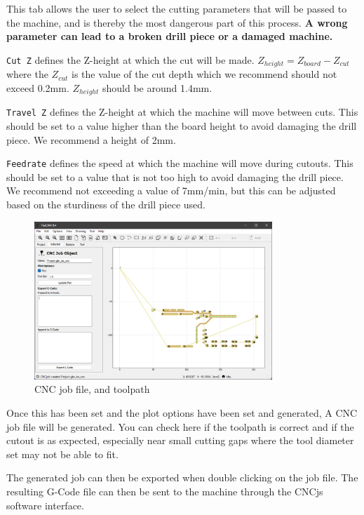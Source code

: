 \documentclass[11pt, openright]{book}
\begin{document}
    This tab allows the user to select the cutting parameters that will be passed to the machine, and is thereby the most dangerous part of this process. \textbf{A wrong parameter can lead to a broken drill piece or a damaged machine.}

    \texttt{Cut Z} defines the Z-height at which the cut will be made.
    $Z_{height}=Z_{board}-Z_{cut}$ where the $Z_{cut}$ is the value of the cut depth which we recommend should not exceed 0.2mm. $Z_{height}$ should be around 1.4mm.  

    \texttt{Travel Z} defines the Z-height at which the machine will move between cuts. This should be set to a value higher than the board height to avoid damaging the drill piece. We recommend a height of 2mm. 

    \texttt{Feedrate} defines the speed at which the machine will move during cutouts. This should be set to a value that is not too high to avoid damaging the drill piece. We recommend not exceeding a value of 7mm/min, but this can be adjusted based on the sturdiness of the drill piece used.



     \begin{figure}[ht!]
        \centering
        \includegraphics[width=0.8\textwidth]{./includes/G4.png}
        \caption{CNC job file, and toolpath}
    \end{figure}

    Once this has been set and the plot options have been set and generated, A CNC job file will be generated. You can check here if the toolpath is correct and if the cutout is as expected, especially near small cutting gaps where the tool diameter set may not be able to fit.

    The generated job can then be exported when double clicking on the job file. The resulting G-Code file can then be sent to the machine through the CNCjs software interface. 
\end{document}
